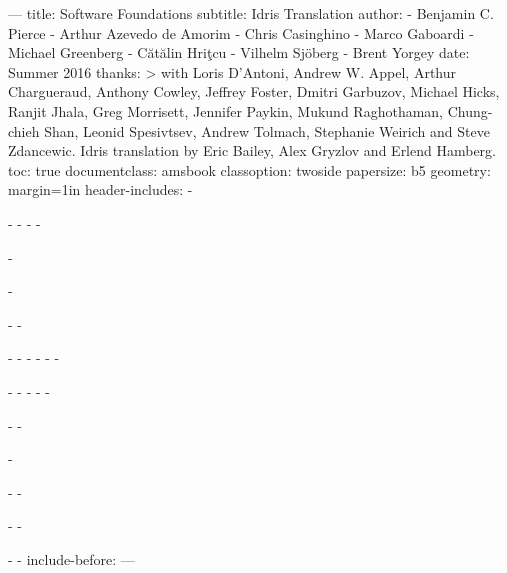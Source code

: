 ---
title: Software Foundations
subtitle: Idris Translation
author:
- Benjamin C. Pierce
- Arthur Azevedo de Amorim
- Chris Casinghino
- Marco Gaboardi
- Michael Greenberg
- Cătălin Hriţcu
- Vilhelm Sjöberg
- Brent Yorgey
date: Summer 2016
thanks: >
  with Loris D'Antoni, Andrew W. Appel, Arthur Chargueraud, Anthony Cowley,
  Jeffrey Foster, Dmitri Garbuzov, Michael Hicks, Ranjit Jhala, Greg Morrisett,
  Jennifer Paykin, Mukund Raghothaman, Chung-chieh Shan, Leonid Spesivtsev,
  Andrew Tolmach, Stephanie Weirich and Steve Zdancewic.\newline\newline
  Idris translation by Eric Bailey, Alex Gryzlov and Erlend Hamberg.
toc: true
documentclass: amsbook
classoption: twoside
papersize: b5
geometry: margin=1in
header-includes:
- \usepackage[american]{babel}
-
- \setmonofont{Iosevka}
-
- \usepackage[utf8]{inputenc}
- \usepackage{newunicodechar}
- 

-
- \usepackage{minted}
- 
- 
- 
- 
-
- \usepackage[xindy]{glossaries}
- \makeglossaries
- 
- \renewcommand*{\glstextformat}[1]{\textsl{#1}}
-
- \usepackage{todonotes}
-
- \usepackage{ebproof}
- \usepackage{dirtytalk}
-
- \usepackage{outlines}
-
- \usepackage[backend=biber, dateabbrev=false, hyperref=true, style=numeric]{biblatex}
- \newcommand{\citefieldlink}[2]{\hyperlink{cite.\therefsection @#1}{\textit{\citefield{#1}{#2}}}}
- 
include-before: \frontmatter
---

\mainmatter
